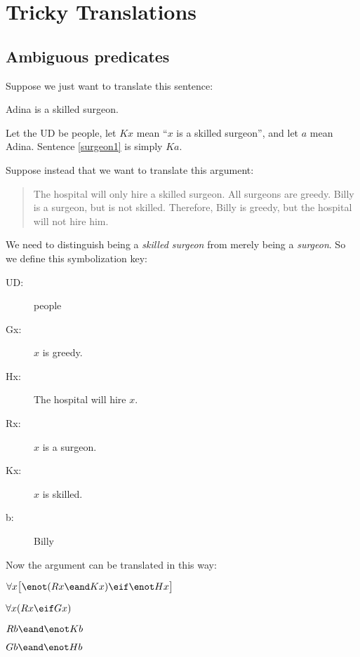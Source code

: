 \section{Tricky Translations}



\subsection{Ambiguous predicates}

Suppose we just want to translate this sentence:
\begin{kormanize}
\item[\ex{surgeon1}] Adina is a skilled surgeon.
\end{kormanize}
Let the UD be people, let $Kx$ mean ``$x$ is a skilled surgeon'', and let $a$ mean Adina. Sentence \ref{surgeon1} is simply $Ka$.


Suppose instead that we want to translate this argument:
\begin{quote}
The hospital will only hire a skilled surgeon. All surgeons are greedy. Billy is a surgeon, but is not skilled. Therefore, Billy is greedy, but the hospital will not hire him.
\end{quote}
We need to distinguish being a \emph{skilled surgeon} from merely being a \emph{surgeon}. So we define this symbolization key:
\begin{description}
\item[UD:] people
\item[Gx:] $x$ is greedy.
\item[Hx:] The hospital will hire $x$.
\item[Rx:] $x$ is a surgeon.
\item[Kx:] $x$ is skilled.
\item[b:] Billy
\end{description}

Now the argument can be translated in this way:
\begin{kormanize}
\label{surgeon2}
\item[] $\forall x\bigl[\enot (Rx \eand Kx) \eif \enot Hx\bigr]$
\item[] $\forall x(Rx \eif Gx)$
\item[] $Rb \eand \enot Kb$
\item[\therefore] $Gb \eand \enot Hb$
\end{kormanize}

